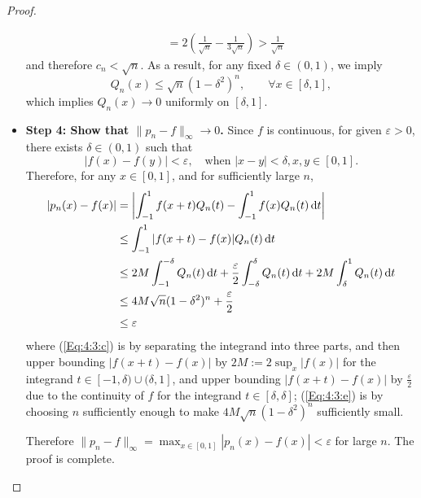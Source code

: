 \begin{proof}
\begin{itemize}
\begin{align*}
&=2(\frac{1}{\sqrt{n}} - \frac{1}{3\sqrt{n}}) >\frac{1}{\sqrt{n}}
\end{align*}
and therefore $c_n<\sqrt{n}$. As a result, for any fixed $\delta\in(0,1)$, we imply
\[
Q_n(x)\le\sqrt{n}(1-\delta^2)^n,\qquad \forall x\in[\delta,1],
\]
which implies $Q_n(x)\to0$ uniformly on $[\delta,1]$.
\item
\textbf{Step 4: Show that $\|p_n-f\|_\infty\to0$.}
Since $f$ is continuous, for given $\varepsilon>0$, there exists $\delta\in(0,1)$ such that
\[
|f(x)-f(y)|<\varepsilon,\quad\text{when }|x-y|<\delta,x,y\in[0,1].
\]
Therefore, for any $x\in[0,1]$, and for sufficiently large $n$,
\begin{subequations}
\begin{align}
|p_n(x)-f(x)|&=\left|\int_{-1}^1f(x+t)Q_n(t) - \int_{-1}^1f(x)Q_n(t)\diff t\right|\\
&\le\int_{-1}^1|f(x+t)-f(x)|Q_n(t)\diff t\\
&\le 2M\int_{-1}^{-\delta}Q_n(t)\diff t+\frac{\varepsilon}{2}\int_{-\delta}^{\delta}Q_n(t)\diff t
+2M\int_{\delta}^1Q_n(t)\diff t\label{Eq:4:3:c}\\
&\le 4M\sqrt{n}(1-\delta^2)^n+\frac{\varepsilon}{2}\label{Eq:4:3:d}\\
&\le\varepsilon\label{Eq:4:3:e}
\end{align}
\end{subequations}
where (\ref{Eq:4:3:c}) is by separating the integrand into three parts, and then upper bounding $|f(x+t)-f(x)|$ by $2M:=2\sup_{x}|f(x)|$ for the integrand $t\in[-1,\delta)\cup(\delta,1]$, and upper bounding $|f(x+t)-f(x)|$ by $\frac{\varepsilon}{2}$ due to the continuity of $f$ for the integrand $t\in[\delta,\delta]$; (\ref{Eq:4:3:e}) is by choosing $n$ sufficiently enough to make $4M\sqrt{n}(1-\delta^2)^n$ sufficiently small.

Therefore $\|p_n-f\|_\infty=\max_{x\in[0,1]}|p_n(x)-f(x)|<\varepsilon$ for large $n$. The proof is complete.
\end{itemize}
\end{proof}





















